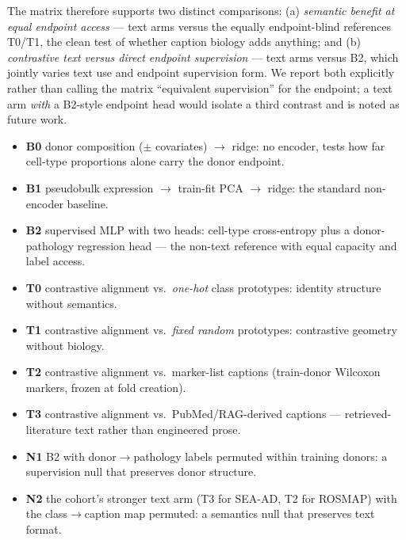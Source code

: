 \documentclass[11pt]{article}
\begin{document}
The matrix therefore supports two distinct comparisons: (a)
\emph{semantic benefit at equal endpoint access} --- text arms versus
the equally endpoint-blind references T0/T1, the clean test of whether
caption biology adds anything; and (b) \emph{contrastive text versus
direct endpoint supervision} --- text arms versus B2, which jointly
varies text use and endpoint supervision form. We report both
explicitly rather than calling the matrix ``equivalent supervision''
for the endpoint; a text arm \emph{with} a B2-style endpoint head would
isolate a third contrast and is noted as future work.

\begin{itemize}
  \item \textbf{B0} donor composition ($\pm$ covariates) $\to$ ridge:
    no encoder, tests how far cell-type proportions alone carry the
    donor endpoint.
  \item \textbf{B1} pseudobulk expression $\to$ train-fit PCA $\to$
    ridge: the standard non-encoder baseline.
  \item \textbf{B2} supervised MLP with two heads: cell-type
    cross-entropy plus a donor-pathology regression head --- the
    non-text reference with equal capacity and label access.
  \item \textbf{T0} contrastive alignment vs.\ \emph{one-hot} class
    prototypes: identity structure without semantics.
  \item \textbf{T1} contrastive alignment vs.\ \emph{fixed random}
    prototypes: contrastive geometry without biology.
  \item \textbf{T2} contrastive alignment vs.\ marker-list captions
    (train-donor Wilcoxon markers, frozen at fold creation).
  \item \textbf{T3} contrastive alignment vs.\ PubMed/RAG-derived
    captions --- retrieved-literature text rather than engineered
    prose.
  \item \textbf{N1} B2 with donor$\to$pathology labels permuted within
    training donors: a supervision null that preserves donor
    structure.
  \item \textbf{N2} the cohort's stronger text arm (T3 for SEA-AD, T2
    for ROSMAP) with the class$\to$caption map permuted: a semantics
    null that preserves text format.
\end{itemize}
\end{document}
